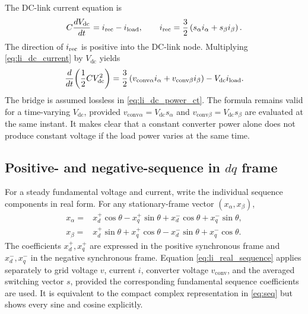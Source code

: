 The DC-link current equation is
\begin{equation}\label{eq:li_dc_current}
C\frac{dV_{\mathrm{dc}}}{dt}
=i_{\rm rec}-i_{\rm load},\qquad
i_{\rm rec}=\frac32\left(s_\alpha i_\alpha+s_\beta i_\beta\right).
\end{equation}
The direction of \(i_{\rm rec}\) is positive into the DC-link node. Multiplying \eqref{eq:li_dc_current} by \(V_{\mathrm{dc}}\) yields
\begin{equation}\label{eq:li_dc_power_ct}
\frac{d}{dt}\!\left(\frac12CV_{\mathrm{dc}}^2\right)
=\frac32\left(v_{\mathrm{conv}\alpha} i_\alpha+v_{\mathrm{conv}\beta} i_\beta\right)
-V_{\mathrm{dc}}i_{\rm load}.
\end{equation}
The bridge is assumed lossless in \eqref{eq:li_dc_power_ct}. The formula remains valid for a time-varying \(V_{\mathrm{dc}}\), provided \(v_{\mathrm{conv}\alpha}=V_{\mathrm{dc}}s_\alpha\) and \(v_{\mathrm{conv}\beta}=V_{\mathrm{dc}}s_\beta\) are evaluated at the same instant. It makes clear that a constant converter power alone does not produce constant voltage if the load power varies at the same time.

\subsection{Positive- and negative-sequence in \(dq\) frame}
For a steady fundamental voltage and current, write the individual sequence components in real form. For any stationary-frame vector \((x_\alpha,x_\beta)\),
\begin{equation}\label{eq:li_real_sequence}
\begin{aligned}
x_\alpha={}&x_d^+\cos\theta-x_q^+\sin\theta
+x_d^-\cos\theta+x_q^-\sin\theta,\\
x_\beta={}&x_d^+\sin\theta+x_q^+\cos\theta
-x_d^-\sin\theta+x_q^-\cos\theta .
\end{aligned}
\end{equation}
The coefficients \(x_d^+,x_q^+\) are expressed in the positive synchronous frame and \(x_d^-,x_q^-\) in the negative synchronous frame. Equation \eqref{eq:li_real_sequence} applies separately to grid voltage \(v\), current \(i\), converter voltage \(v_{\mathrm{conv}}\), and the averaged switching vector \(s\), provided the corresponding fundamental sequence coefficients are used. It is equivalent to the compact complex representation in \eqref{eq:seq} but shows every sine and cosine explicitly.


